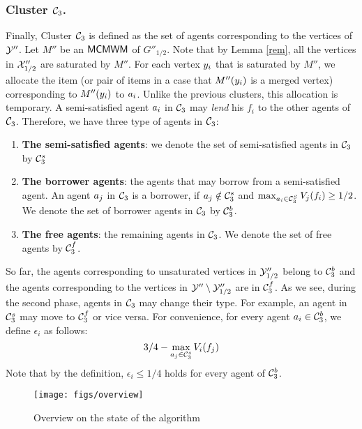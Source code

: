\subsubsection{Cluster $\mathcal{C}_3$.} Finally, Cluster $\mathcal{C}_3$ is defined as the set of agents corresponding to the vertices of $\mathcal{Y}''$. Let $M''$ be an $\textsf{MCMWM}$ of $G''_{1/2}$. Note that by Lemma \ref{rem}, all the vertices in $\mathcal{X}''_{1/2}$ are saturated by $M''$. 
For each vertex $y_i$ that is saturated by $M''$, we allocate the item (or pair of items in a case that $M''(y_i)$ is a merged vertex) corresponding to $M''(y_i)$ to $a_i$. Unlike the previous clusters, this allocation is temporary. A semi-satisfied agent $a_i$ in $\mathcal{C}_3$ may \emph{lend} his $f_i$ to the other agents of $\mathcal{C}_3$. Therefore, we have three type of agents in $\mathcal{C}_3$: 
\begin{enumerate}
    \item \textbf{The semi-satisfied agents}: we denote the set of semi-satisfied agents in $\mathcal{C}_3$ by $\mathcal{C}_3^s$
    \item \textbf{The borrower agents}: the agents that may borrow from a semi-satisfied agent. An agent $a_j$ in $\mathcal{C}_3$ is a borrower, if $a_j \notin \mathcal{C}_3^s$ and $\max_{a_i \in \mathcal{C}_3^S} V_j(f_i) \geq {1/2}$. We denote the set of borrower agents in $\mathcal{C}_3$ by $\mathcal{C}_3^b$.
    \item \textbf{The free agents}: the remaining agents in $\mathcal{C}_3$. We denote the set of free agents by $\mathcal{C}_3^f$.
\end{enumerate}
So far, the agents corresponding to unsaturated vertices in $\mathcal{Y}''_{1/2}$ belong to $\mathcal{C}_3^b$ and the agents corresponding to the vertices in $\mathcal{Y}'' \setminus \mathcal{Y}''_{1/2}$ are in $\mathcal{C}_3^f$. As we see, during the second phase, agents in $\mathcal{C}_3$ may change their type. For example, an agent in $\mathcal{C}_3^s$ may move to $\mathcal{C}_3^f$ or vice versa.  For convenience, for every agent $a_i \in \mathcal{C}_3^b$, we define $\epsilon_i$ as follows: 
\begin{equation}
\label{borrowers}
 3/4 - \max_{a_j \in \mathcal{C}_3^s}V_i(f_j)
\end{equation} 
Note that by the definition, $\epsilon_i \leq 1/4$ holds for every agent of $\mathcal{C}_3^b$.


\begin{figure}[t!]
\centering
\texttt{[image: figs/overview]}
\caption{Overview on the state of the algorithm}
\label{fig:overview}
\end{figure}

